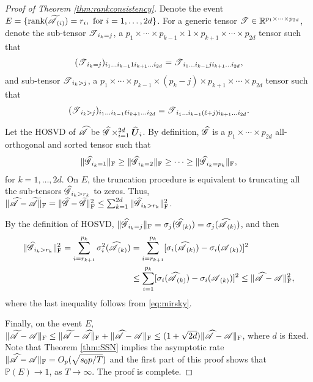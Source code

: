 \documentclass[12pt]{article}
\newcommand{\bm}{\boldsymbol}
\newcommand{\cm}[1]{\mbox{\boldmath$\mathscr{#1}$}}
\begin{document}
\begin{proof}[Proof of Theorem \ref{thm:rankconsistency}]
	Denote the event $E=\{\text{rank}(\cm{\widetilde{A}}_{(i)})=r_i,~\text{for}~i=1,\dots,2d\}$. For a generic tensor $\cm{T}\in\mathbb{R}^{p_1\times\cdots\times p_{2d}}$, denote the sub-tensor $\cm{T}_{i_k=j}$, a $p_1\times\cdots\times p_{k-1}\times 1\times p_{k+1}\times\cdots\times p_{2d}$ tensor such that
	\begin{equation}
		(\cm{T}_{i_k=j})_{i_1\dots i_{k-1}1i_{k+1}\dots i_{2d}}=\cm{T}_{i_1\dots i_{k-1}ji_{k+1}\dots i_{2d}},
	\end{equation}
	and sub-tensor $\cm{T}_{i_k>j}$, a $p_1\times\cdots\times p_{k-1}\times (p_k-j)\times p_{k+1}\times\cdots\times p_{2d}$ tensor such that
	\begin{equation}
	(\cm{T}_{i_k>j})_{i_1\dots i_{k-1}\ell i_{k+1}\dots i_{2d}}=\cm{T}_{i_1\dots i_{k-1}(\ell+j)i_{k+1}\dots i_{2d}}.
	\end{equation}
	
Let the HOSVD of $\cm{\widehat{A}}$ be $\cm{\widehat{G}}\times_{i=1}^{2d}\bm{\widehat{U}}_i$. By definition,  $\cm{\widehat{G}}$ is a $p_1\times\cdots\times p_{2d}$ all-orthogonal and sorted tensor such that
	\begin{equation}
		\|\cm{\widehat{G}}_{i_k=1}\|_{\text{F}}\geq\|\cm{\widehat{G}}_{i_k=2}\|_{\text{F}}\geq\cdots\geq\|\cm{\widehat{G}}_{i_k=p_k}\|_{\text{F}},
	\end{equation}
	for $k=1,\dots,2d$. On $E$, the truncation procedure is equivalent to truncating all the sub-tensors $\cm{\widehat{G}}_{i_k>r_k}$ to zeros. Thus, $\|\cm{\widehat{A}}-\cm{\widetilde{A}}\|_{\text{F}}=\|\cm{\widehat{G}}-\cm{\widetilde{G}}\|_{\text{F}}^2\leq\sum_{k=1}^{2d}\|\cm{\widehat{G}}_{i_k>r_k}\|_{\text{F}}^2$. 
	
	By the definition of HOSVD, $\|\cm{\widehat{G}}_{i_k=j}\|_{\text{F}}=\sigma_j(\cm{\widehat{G}}_{(k)})=\sigma_j(\cm{\widehat{A}}_{(k)})$, and then
	\begin{equation}\begin{split}
		\|\cm{\widehat{G}}_{i_k>r_k}\|_{\text{F}}^2=\sum_{i=r_{k+1}}^{p_k}\sigma_i^2(\cm{\widehat{A}}_{(k)})&=\sum_{i=r_{k+1}}^{p_k}[\sigma_i(\cm{\widehat{A}}_{(k)})-\sigma_i(\cm{A}_{(k)})]^2\\
		&\leq\sum_{i=1}^{p_k}[\sigma_i(\cm{\widehat{A}}_{(k)})-\sigma_i(\cm{A}_{(k)})]^2\leq\|\cm{\widehat{A}}-\cm{A}\|_{\text{F}}^2,
	\end{split}\end{equation} 
	where the last inequality follows from \eqref{eq:mirsky}.
	
	Finally, on the event $E$, $\|\cm{\widetilde{A}}-\cm{A}\|_{\text{F}}\leq\|\cm{\widetilde{A}}-\cm{\widehat{A}}\|_{\text{F}}+\|\cm{\widehat{A}}-\cm{A}\|_{\text{F}}\leq(1+\sqrt{2d})\|\cm{\widehat{A}}-\cm{A}\|_{\text{F}}$, where $d$ is fixed. Note  that Theorem \ref{thm:SSN} implies the asymptotic rate $\|\cm{\widehat{A}}-\cm{A}\|_{\text{F}}=O_p(\sqrt{s_0p/T})$ and the first part of this proof shows that $\mathbb{P}(E)\to1$, as $T\to\infty$. The proof is complete.	
\end{proof}
\end{document}
